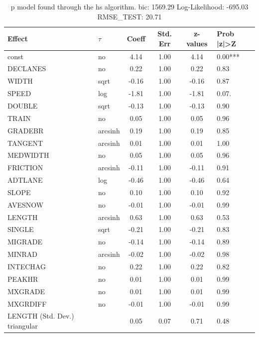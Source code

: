 \begin{table}
	\caption{p model found through the hs algorithm. bic: 1569.29 Log-Likelihood: -695.03 RMSE_TEST: 20.71}
	\begin{center}
		\begin{tabular}{|l|l|c|c|c|l|}
			\hline
			Effect & $\tau$ & Coeff & Std. Err & z-values & Prob |z|>Z \\
			\hline
			const & no & 4.14 & 1.00 & 4.14 & 0.00*** \\
			\hline
			DECLANES & no & 0.22 & 1.00 & 0.22 & 0.83 \\
			\hline
			WIDTH & sqrt & -0.16 & 1.00 & -0.16 & 0.87 \\
			\hline
			SPEED & log & -1.81 & 1.00 & -1.81 & 0.07. \\
			\hline
			DOUBLE & sqrt & -0.13 & 1.00 & -0.13 & 0.90 \\
			\hline
			TRAIN & no & 0.05 & 1.00 & 0.05 & 0.96 \\
			\hline
			GRADEBR & arcsinh & 0.19 & 1.00 & 0.19 & 0.85 \\
			\hline
			TANGENT & arcsinh & 0.01 & 1.00 & 0.01 & 1.00 \\
			\hline
			MEDWIDTH & no & 0.05 & 1.00 & 0.05 & 0.96 \\
			\hline
			FRICTION & arcsinh & -0.11 & 1.00 & -0.11 & 0.91 \\
			\hline
			ADTLANE & log & -0.46 & 1.00 & -0.46 & 0.64 \\
			\hline
			SLOPE & no & 0.10 & 1.00 & 0.10 & 0.92 \\
			\hline
			AVESNOW & no & -0.01 & 1.00 & -0.01 & 0.99 \\
			\hline
			LENGTH & arcsinh & 0.63 & 1.00 & 0.63 & 0.53 \\
			\hline
			SINGLE & sqrt & -0.21 & 1.00 & -0.21 & 0.83 \\
			\hline
			MIGRADE & no & -0.14 & 1.00 & -0.14 & 0.89 \\
			\hline
			MINRAD & arcsinh & -0.02 & 1.00 & -0.02 & 0.98 \\
			\hline
			INTECHAG & no & 0.22 & 1.00 & 0.22 & 0.82 \\
			\hline
			PEAKHR & no & 0.01 & 1.00 & 0.01 & 0.99 \\
			\hline
			MXGRADE & no & 0.01 & 1.00 & 0.01 & 0.99 \\
			\hline
			MXGRDIFF & no & -0.01 & 1.00 & -0.01 & 0.99 \\
			\hline
			LENGTH (Std. Dev.) triangular &  & 0.05 & 0.07 & 0.71 & 0.48 \\

\end{tabular}
\end{center}
\end{table}
